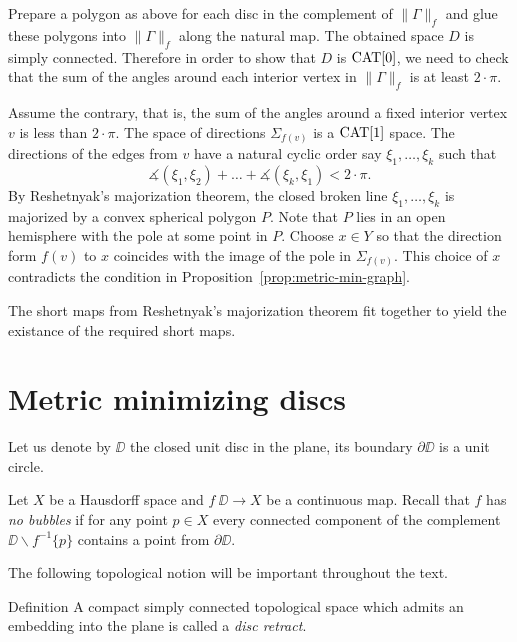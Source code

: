 \documentclass{article}
\begin{document}
Prepare a polygon as above for each disc in the complement of $\|\Gamma\|_f$
and glue these polygons into $\|\Gamma\|_f$ along the natural map.
The obtained space $D$ is simply connected.
Therefore in order to show that $D$ is $\mathop{\rm CAT}\nolimits[0]$,
we need to check that the sum of the angles around each interior vertex in $\|\Gamma\|_f$ is at least $2\cdot\pi$.


Assume the contrary, that is, 
the sum of the angles around a fixed interior vertex $v$ is less than $2\cdot\pi$.
The space of directions $\Sigma_{f(v)}$ is a $\mathop{\rm CAT}\nolimits[1]$ space.
The directions of the edges from $v$ have a natural
cyclic order say $\xi_1,\dots,\xi_k$
such that
\[\measuredangle(\xi_1,\xi_2)+\dots+\measuredangle(\xi_k,\xi_1)<2\cdot\pi.\]
By Reshetnyak's majorization theorem,
the closed broken line $\xi_1,\dots,\xi_k$ is majorized by a convex spherical polygon $P$.
Note that $P$ lies in an open hemisphere with the pole  at some point in $P$.
Choose $x\in Y$ so that the direction form $f(v)$ to $x$ coincides with the image of the pole in $\Sigma_{f(v)}$.
This choice of $x$ contradicts the condition in Proposition~\ref{prop:metric-min-graph}.

The short maps from Reshetnyak's majorization theorem fit together to yield the existance of the required short maps.
\qeds







\section{Metric minimizing discs}\label{Metric minimizing discs}



Let us denote by $\DD$ the closed unit disc in the plane,
its boundary $\partial \DD$ is a unit circle.

Let $X$ be a Hausdorff space and
$f\:\DD\to X$ be a continuous map.
Recall that $f$ has \emph{no bubbles}\label{page:no-bubble}
if for any point $p\in X$ every connected component of the complement $\DD\backslash f^{-1}\{p\}$ contains a point from $\partial \DD$.

The following topological notion will be important throughout the text.

\begin{thm}{Definition}
A compact simply connected topological space which admits an embedding into the plane is 
called a \emph{disc retract}. 
\end{thm}
\end{document}
